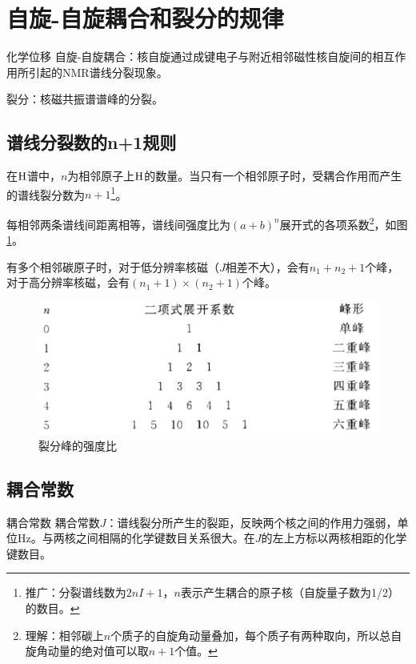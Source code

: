 \section{自旋-自旋耦合和裂分的规律}

\begin{definition*}{化学位移}{}
	自旋-自旋耦合：核自旋通过成键电子与附近相邻磁性核自旋间的相互作用所引起的NMR谱线分裂现象。
	
	裂分：核磁共振谱谱峰的分裂。
\end{definition*}

\subsection{谱线分裂数的n+1规则}

在$\ce{H}$谱中，$n$为相邻原子上$\ce{H}$的数量。当只有一个相邻原子时，受耦合作用而产生的谱线裂分数为$n+1$\footnote{推广：分裂谱线数为$2nI+1$，$n$表示产生耦合的原子核（自旋量子数为1/2）的数目。}。

每相邻两条谱线间距离相等，谱线间强度比为$(a+b)^n$展开式的各项系数\footnote{理解：相邻碳上$n$个质子的自旋角动量叠加，每个质子有两种取向，所以总自旋角动量的绝对值可以取$n+1$个值。}，如图\ref{fig:chp6split}。

有多个相邻碳原子时，对于低分辨率核磁（$J$相差不大），会有$n_1+n_2+1$个峰，对于高分辨率核磁，会有$(n_1+1)\times (n_2+1)$个峰。

\begin{figure}[!h]
	\centering
	\includegraphics[width=0.7\linewidth]{image/chp6_split}
	\caption{裂分峰的强度比}
	\label{fig:chp6split}
\end{figure}

\subsection{耦合常数}

\begin{definition*}{耦合常数}{}
	耦合常数$J$：谱线裂分所产生的裂距，反映两个核之间的作用力强弱，单位Hz。与两核之间相隔的化学键数目关系很大。在$J$的左上方标以两核相距的化学键数目。
\end{definition*}

